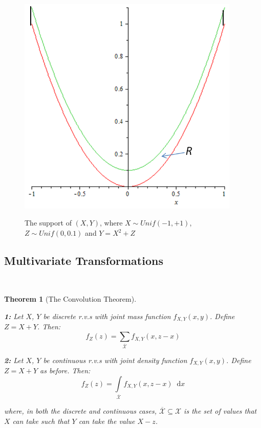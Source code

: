\documentclass[12pt,a4paper]{article}
\newcommand{\diff}{\;\mathrm{d}}
\newtheorem{thm}{Theorem}[subsection]
\begin{document}
\begin{figure}[h]
\begin{center}
\includegraphics[height=10.58cm,width=10.58cm]{M2S1 Uncorrelated but Dependent.png}\label{figure uncorrelated, dependent}
\caption{The support of $(X,Y)$, where $X \sim Unif(-1,+1)$, $Z \sim Unif(0,0.1)$ and $Y = X^2 + Z$}
\end{center}
\end{figure}

\subsection{Multivariate Transformations}$\;$

\begin{thm}[The Convolution Theorem]$\quad$\par\vspace{1cm}

\noindent\textbf{1: } Let $X$, $Y$ be discrete r.v.s with joint mass function $f_{X,Y}(x,y)$. Define $Z=X+Y$. Then:
$$f_Z(z) = \sum\limits_{\overline{\mathcal{X}}} f_{X,Y}(x,z-x)$$

\noindent\textbf{2: } Let $X$, $Y$ be continuous r.v.s with joint density function $f_{X,Y}(x,y)$. Define $Z=X+Y$ as before. Then:
$$f_Z(z) = \int\limits_{\overline{\mathcal{X}}}\!\! f_{X,Y}(x,z-x)\;\diff x$$

\noindent where, in both the discrete and continuous cases, $\overline{\mathcal{X}}\subseteq\mathcal{X}$ is the set of values that $X$ can take such that $Y$ can take the value $X-z$.

\end{thm}
\end{document}
